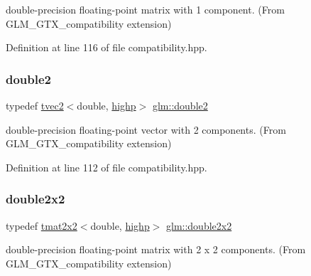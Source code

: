 double-\/precision floating-\/point matrix with 1 component. (From G\+L\+M\+\_\+\+G\+T\+X\+\_\+compatibility extension) 



Definition at line 116 of file compatibility.\+hpp.

\mbox{\label{group__gtx__compatibility_ga490652005dad57a41887b974195f36c1}} 
\subsubsection{\texorpdfstring{double2}{double2}}
{\footnotesize\ttfamily typedef \mbox{\hyperlink{structglm_1_1tvec2}{tvec2}}$<$double, \mbox{\hyperlink{namespaceglm_a0f04f086094c747d227af4425893f545ac6f7eab42eacbb10d59a58e95e362074}{highp}}$>$ \mbox{\hyperlink{group__gtx__compatibility_ga490652005dad57a41887b974195f36c1}{glm\+::double2}}}



double-\/precision floating-\/point vector with 2 components. (From G\+L\+M\+\_\+\+G\+T\+X\+\_\+compatibility extension) 



Definition at line 112 of file compatibility.\+hpp.

\mbox{\label{group__gtx__compatibility_ga7651d80f2dcc222a2e229ce44af96f11}} 
\subsubsection{\texorpdfstring{double2x2}{double2x2}}
{\footnotesize\ttfamily typedef \mbox{\hyperlink{structglm_1_1tmat2x2}{tmat2x2}}$<$double, \mbox{\hyperlink{namespaceglm_a0f04f086094c747d227af4425893f545ac6f7eab42eacbb10d59a58e95e362074}{highp}}$>$ \mbox{\hyperlink{group__gtx__compatibility_ga7651d80f2dcc222a2e229ce44af96f11}{glm\+::double2x2}}}



double-\/precision floating-\/point matrix with 2 x 2 components. (From G\+L\+M\+\_\+\+G\+T\+X\+\_\+compatibility extension) 



